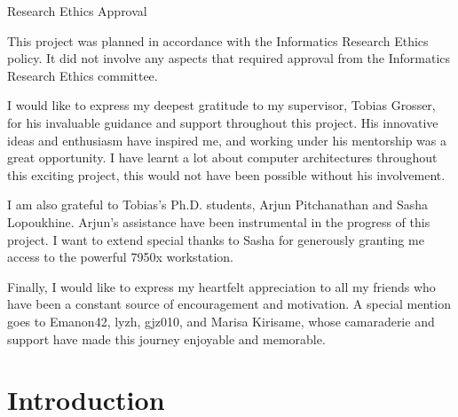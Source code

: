 \documentclass[logo,bsc,singlespacing,parskip]{infthesis}
\begin{document}
\begin{preliminary}
{%

}

\maketitle

\newenvironment{ethics}
   {\begin{frontenv}{Research Ethics Approval}{\LARGE}}
   {\end{frontenv}\newpage}

\begin{ethics}

This project was planned in accordance with the Informatics Research
Ethics policy. It did not involve any aspects that required approval
from the Informatics Research Ethics committee.

\standarddeclaration
\end{ethics}


\begin{acknowledgements}
    I would like to express my deepest gratitude to my supervisor, Tobias Grosser,
    for his invaluable guidance and support throughout this project. His
    innovative ideas and enthusiasm have inspired me, and working under his
    mentorship was a great opportunity. I have learnt a lot about computer
    architectures throughout this exciting project, this would not have been
    possible without his involvement.

    I am also grateful to Tobias's Ph.D. students, Arjun Pitchanathan
    and Sasha Lopoukhine. Arjun's assistance have been instrumental
    in the progress of this project. I want to extend special thanks to
    Sasha for generously granting me access to the powerful 7950x workstation.
    
    Finally, I would like to express my heartfelt appreciation to all my friends
    who have been a constant source of encouragement and motivation. A special
    mention goes to Emanon42, lyzh, gjz010, and Marisa Kirisame, whose
    camaraderie and support have made this journey enjoyable and memorable.

\end{acknowledgements}


\tableofcontents
\end{preliminary}


\chapter{Introduction}
\label{sec:introduction}
\end{document}

